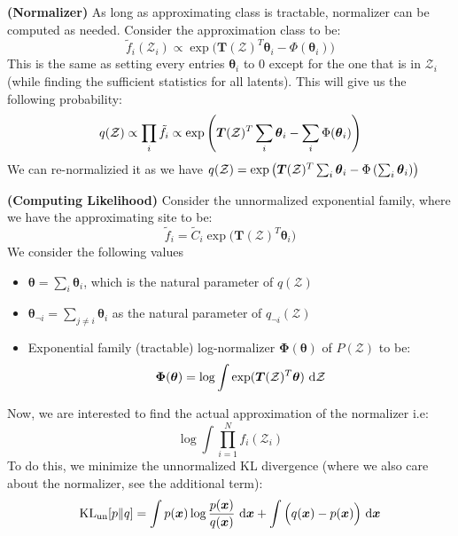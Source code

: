 \begin{remark}{\textbf{(Normalizer)}}
    As long as approximating class is tractable, normalizer can be computed as needed. Consider the approximation class to be:
    \begin{equation*}
        \tilde{f}_i(\mathcal{Z}_i) \propto \exp\Big( \boldsymbol T(\mathcal{Z})^T\boldsymbol \theta_i - \Phi(\boldsymbol \theta_i) \Big)
    \end{equation*}
    This is the same as setting every entries $\boldsymbol \theta_i$ to $0$ except for the one that is in $\mathcal{Z}_i$ (while finding the sufficient statistics for all latents). This will give us the following probability:
    \begin{equation*}
        q(\mathcal{Z}) \propto \prod_i\tilde{f}_i \propto \exp\left( \boldsymbol T(\mathcal{Z})^T\sum_i\boldsymbol \theta_i - \sum_i\Phi(\boldsymbol \theta_i) \right)
    \end{equation*}
    We can re-normalizied it as we have $q(\mathcal{Z}) = \exp\left( \boldsymbol T(\mathcal{Z})^T\sum_i\boldsymbol \theta_i - \Phi\left( \sum_i\boldsymbol \theta_i \right) \right)$
\end{remark}

\begin{remark}{\textbf{(Computing Likelihood)}}
    Consider the unnormalized exponential family, where we have the approximating site to be:
    \begin{equation*}
        \tilde{f}_i = \tilde{C}_i\exp\Big( \boldsymbol T(\mathcal{Z})^T\boldsymbol \theta_i \Big)
    \end{equation*}
    We consider the following values 
    \begin{itemize}
        \item $\boldsymbol \theta = \sum_i\boldsymbol \theta_i$, which is the natural parameter of $q(\mathcal{Z})$
        \item $\boldsymbol \theta_{\neg i} = \sum_{j\ne i}\boldsymbol \theta_i$ as the natural parameter of $q_{\neg i}(\mathcal{Z})$
        \item Exponential family (tractable) log-normalizer $\boldsymbol \Phi(\boldsymbol \theta)$ of $P(\mathcal{Z})$ to be:
        \begin{equation*}
            \boldsymbol \Phi(\boldsymbol \theta) = \log \int \exp(\boldsymbol T(\mathcal{Z})^T\boldsymbol \theta) \ \mathrm{d} \mathcal{Z}
        \end{equation*}
    \end{itemize}
    Now, we are interested to find the actual approximation of the normalizer i.e:
    \begin{equation*}
        \log \int \prod^N_{i=1}f_i(\mathcal{Z}_i)
    \end{equation*}
    To do this, we minimize the unnormalized KL divergence (where we also care about the normalizer, see the additional term):
    \begin{equation*}
        \operatorname{KL}_\text{un}[p\| q] = \int p(\boldsymbol x)\log \frac{p(\boldsymbol x)}{q(\boldsymbol x)}\ \mathrm{d} \boldsymbol x + \int \Big( q(\boldsymbol x) - p(\boldsymbol x) \Big)\ \mathrm{d} \boldsymbol x
    \end{equation*}
\end{remark}


